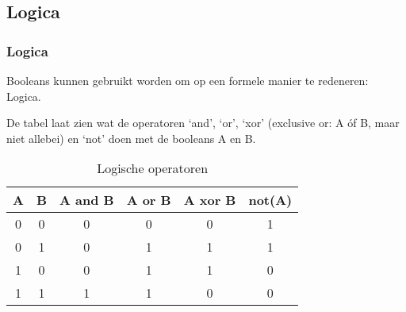 \subsection{Logica}

\begin{frame}
\frametitle{Logica}

Booleans kunnen gebruikt worden om op een formele manier te redeneren: Logica.

\pause
De tabel laat zien wat de operatoren `and', `or', `xor' (exclusive or: A \'of B, maar niet allebei)
en `not' doen met de booleans A en B.

\begin{table}[h]
\begin{tabular}{|c|c||c|c|c|c|}\hline
A & B & A and B & A or B 	& A xor B 	& not(A)\\\hline\hline%
0 & 0 & 0 		& 0 		& 0 		& 1\\\hline%
0 & 1 & 0 		& 1 		& 1 		& 1\\\hline%
1 & 0 & 0 		& 1 		& 1 		& 0\\\hline%
1 & 1 & 1 		& 1 		& 0 		& 0\\\hline%
\end{tabular}
\caption{Logische operatoren}
\label{table:logic_operators}
\end{table}


\end{frame}

